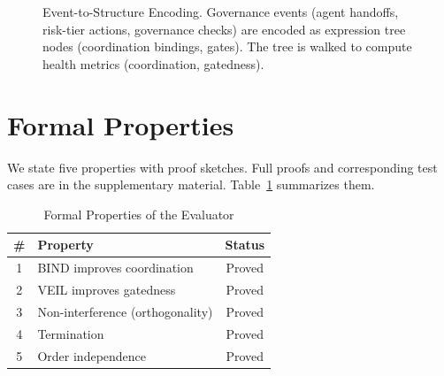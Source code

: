 \documentclass[sigconf,nonacm]{acmart}
\begin{document}
\begin{figure}[t]
  \caption{Event-to-Structure Encoding. Governance events (agent handoffs,
    risk-tier actions, governance checks) are encoded as expression tree
    nodes (coordination bindings, gates). The tree is walked to compute
    health metrics (coordination, gatedness).}
  \label{fig:encoding}
\end{figure}


\section{Formal Properties}\label{sec:formal}

We state five properties with proof sketches. Full proofs and corresponding
test cases are in the supplementary material. Table~\ref{tab:properties}
summarizes them.

\begin{table}[t]
  \caption{Formal Properties of the Evaluator}\label{tab:properties}
  \small
  \begin{tabular}{@{}clc@{}}
    \toprule
    \textbf{\#} & \textbf{Property} & \textbf{Status} \\
    \midrule
    1 & BIND improves coordination & Proved \\
    2 & VEIL improves gatedness & Proved \\
    3 & Non-interference (orthogonality) & Proved \\
    4 & Termination & Proved \\
    5 & Order independence & Proved \\
    \bottomrule
  \end{tabular}
\end{table}
\end{document}
